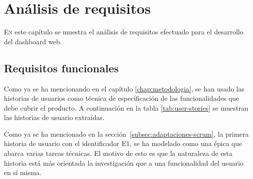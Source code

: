 \chapter{Análisis de requisitos}
\label{chap:analisis}
\lettrine{E}{n} este capítulo se muestra el análisis de requisitos efectuado para el desarrollo del dashboard web.

\section{Requisitos funcionales}
Como ya se ha mencionando en el capítulo \ref{chap:metodologia}, se han usado las historias de usuarios como técnica de especificación de las funcionalidades que debe cubrir el producto. A continuación en la tabla \ref{tab:user-stories} se muestran las historias de usuario extraídas.

Como ya se ha mencionado en la sección~\ref{subsec:adaptaciones-scrum}, la primera historia de usuario con el identificador E1, se ha modelado como una épica que abarca varias tareas técnicas. El motivo de esto es que la naturaleza de esta historia está más orientada la investigación que a una funcionalidad del usuario en sí misma.


